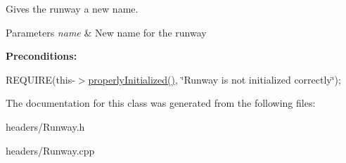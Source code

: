 Gives the runway a new name. 


\begin{DoxyParams}{Parameters}
{\em name} & New name for the runway\\
\hline
\end{DoxyParams}
{\bfseries Preconditions\+:}
\begin{DoxyItemize}
\item R\+E\+Q\+U\+I\+RE(this-\/$>$\mbox{\hyperlink{class_runway_a360d98246cabf3aa929765f81a656348}{properly\+Initialized()}}, \char`\"{}\+Runway is not initialized correctly\char`\"{}); 
\end{DoxyItemize}

The documentation for this class was generated from the following files\+:\begin{DoxyCompactItemize}
\item 
headers/Runway.\+h\item 
headers/Runway.\+cpp\end{DoxyCompactItemize}
